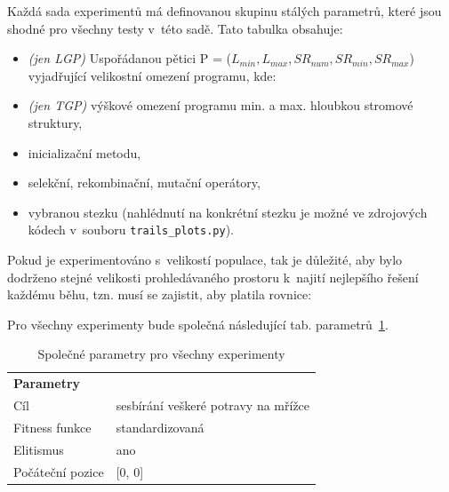 \noindent Každá sada experimentů má definovanou skupinu stálých parametrů, které jsou shodné pro všechny testy v~této sadě. Tato tabulka obsahuje:
\begin{itemize}
    \item \emph{(jen LGP)} Uspořádanou pětici P = ($L_{min}, L_{max}, SR_{num}, SR_{min}, SR_{max}$) vyjadřující velikostní omezení programu, kde:
    \item \emph{(jen TGP)} výškové omezení programu min. a max. hloubkou stromové struktury,
    \item inicializační metodu,
    \item selekční, rekombinační, mutační operátory,
    \item vybranou stezku (nahlédnutí na konkrétní stezku je možné ve zdrojových kódech v~souboru \texttt{trails\_plots.py}).
  
\end{itemize}

\noindent Pokud je experimentováno s~velikostí populace, tak je důležité, aby bylo dodrženo stejné velikosti prohledávaného prostoru k~najití nejlepšího řešení každému běhu, tzn. musí se zajistit, aby platila rovnice: \\

\begin{center}
\end{center} 
\bigskip
\noindent Pro všechny experimenty bude společná následující tab. parametrů~\ref{tab:params_all}.

\begin{table}[!h]
\centering
\begin{tabular}{ll}
\hline
\textbf{Parametry} &                                     \\
Cíl                & sesbírání veškeré potravy na mřížce \\
Fitness funkce     & standardizovaná                       \\
Elitismus          & ano                       \\
Počáteční pozice   & {[0, 0]}                          \\ \hline
\end{tabular}
\caption{Společné parametry pro všechny experimenty}
\label{tab:params_all}
\end{table}

